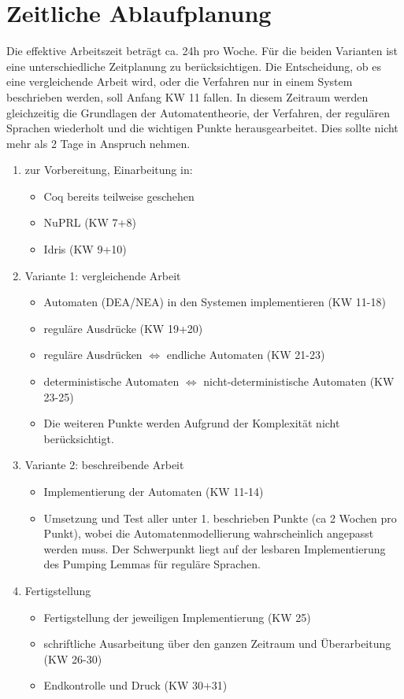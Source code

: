 \section{Zeitliche Ablaufplanung}
Die effektive Arbeitszeit betr\"agt ca. 24h pro Woche. Für die beiden Varianten ist eine unterschiedliche Zeitplanung zu ber\"ucksichtigen. Die Entscheidung, ob es eine vergleichende Arbeit wird, oder die Verfahren nur in einem System beschrieben werden, soll Anfang KW 11 fallen. In diesem Zeitraum werden gleichzeitig die Grundlagen der Automatentheorie, der Verfahren, der regul\"aren Sprachen wiederholt und die wichtigen Punkte herausgearbeitet. Dies sollte nicht mehr als 2 Tage in Anspruch nehmen.
\begin{enumerate}
 \item zur Vorbereitung, Einarbeitung in:
 \begin{itemize}
  \item Coq bereits teilweise geschehen
  \item NuPRL (KW 7+8)
  \item Idris (KW 9+10)
 \end{itemize}
 \item Variante 1: vergleichende Arbeit
 \begin{itemize}
  \item Automaten (DEA/NEA) in den Systemen implementieren (KW 11-18)
  \item regul\"are Ausdr\"ucke (KW 19+20)
  \item regul\"are Ausdr\"ucken $\Leftrightarrow$ endliche Automaten (KW 21-23)
  \item deterministische Automaten $\Leftrightarrow$ nicht-deterministische Automaten (KW 23-25)
  \item Die weiteren Punkte werden Aufgrund der Komplexit\"at nicht ber\"ucksichtigt.
 \end{itemize}
 \item Variante 2: beschreibende Arbeit
 \begin{itemize}
  \item Implementierung der Automaten (KW 11-14)
  \item Umsetzung und Test aller unter 1. beschrieben Punkte (ca 2 Wochen pro Punkt), wobei die Automatenmodellierung wahrscheinlich angepasst werden muss. Der Schwerpunkt liegt auf der lesbaren Implementierung des Pumping Lemmas f\"ur regul\"are Sprachen.
 \end{itemize}
 \item Fertigstellung
 \begin{itemize}
  \item Fertigstellung der jeweiligen Implementierung (KW 25)
  \item schriftliche Ausarbeitung \"uber den ganzen Zeitraum und \"Uberarbeitung (KW 26-30)
  \item Endkontrolle und Druck (KW 30+31)
 \end{itemize}
\end{enumerate}
